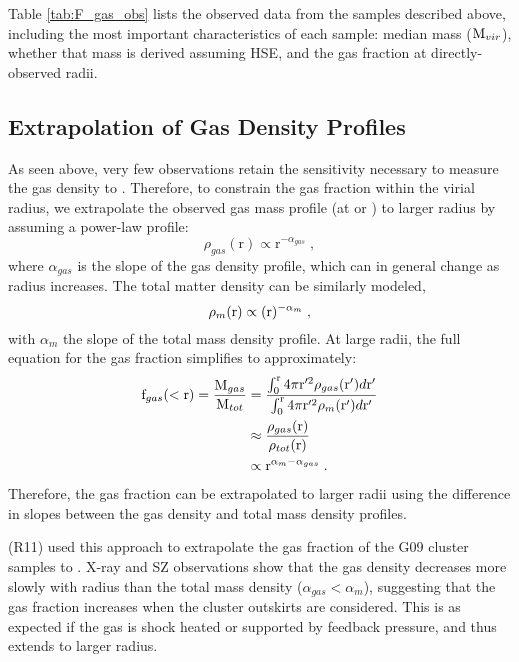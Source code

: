 Table \ref{tab:F_gas_obs} lists the observed data from the samples
described above, including the most important characteristics of each
sample: median mass ($\textrm{M\ensuremath{_{vir}}}$), whether that mass is derived
assuming HSE, and the gas fraction at directly-observed radii.



\subsection{Extrapolation of Gas Density Profiles}
\label{sec:Gas.Extrapolation}
As seen above, very few observations retain the sensitivity necessary
to measure the gas density to \rvir{}. Therefore, to constrain the gas
fraction within the virial radius, we extrapolate the observed gas
mass profile (at \rtwo{} or \rfive{}) to larger radius by assuming a
power-law profile:
\begin{equation}
\rho_{gas}(\textrm{r}) \propto \textrm{r}^{-\alpha_{gas}}\;, 
\end{equation}
where $\alpha{}_{gas}$ is the slope of the gas density profile, which can in
general change as radius increases. The total
matter density can be similarly modeled,
\begin{equation}
\rho_{m}(\textrm{r}) \propto (\textrm{r})^{-\alpha_{m}}\;,
\end{equation}
with $\alpha{}_m$ the slope of the total mass density profile. At
large radii, the full equation for the gas fraction simplifies to approximately:
\begin{align}
\textrm{f\ensuremath{_{gas}}}(<\textrm{r}) = \frac{\textrm{M}_{gas}}{\textrm{M}_{tot}} &=
\frac{\int_0^{\textrm{r}} 4\pi{}\textrm{r}'^2\rho_{gas}(\textrm{r}')d\textrm{r}'}{\int_0^{\textrm{r}}
  4\pi{}\textrm{r}'^2\rho_{m}(\textrm{r}')d\textrm{r}'} \\ & \approx
\frac{\rho_{gas}(\textrm{r})}{\rho_{tot}(\textrm{r})} \nonumber\\ &\propto \textrm{r}^{\alpha_{m} - \alpha_{gas}}\;.
\end{align}
Therefore, the gas fraction can be extrapolated to larger radii using
the difference in slopes between the gas density and total mass
density profiles.

\textbf{\citet{Rasheed2011}} (R11) used this approach to extrapolate
the gas fraction of the G09 cluster samples to \rvir{}. X-ray and SZ
observations show that the gas density decreases more slowly with
radius than the total mass density ($\alpha_{gas} < \alpha_{m}$),
suggesting that the gas fraction increases when the cluster outskirts
are considered. This is as expected if the gas is shock heated or
supported by feedback pressure, and thus extends to larger radius.

